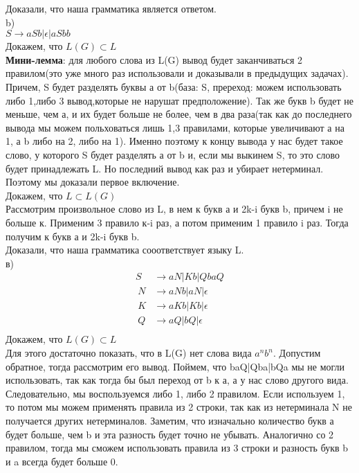 \documentclass[a4paper,12pt]{article}
\begin{document}
Доказали, что наша грамматика является ответом.\\
b)\\
$S\rightarrow aSb|\epsilon|aSbb$\\
Докажем, что $L(G)\subset L$\\
\textbf{Мини-лемма}: для любого слова из L(G) вывод будет заканчиваться 2 правилом(это уже много раз использовали и доказывали в предыдущих задачах). Причем, S будет разделять буквы а от b(база: S, пререход: можем использовать либо 1,либо 3 вывод,которые не нарушат предположение). Так же букв b будет не меньше, чем а, и их будет больше не более, чем в два раза(так как до последнего вывода мы можем польховаться лишь  1,3 правилами, которые увеличивают а на 1, а b либо на 2, либо на 1). Именно поэтому к концу вывода у нас будет такое слово, у которого S будет разделять а от b и, если мы выкинем S, то это слово будет принадлежать L. Но последний вывод как раз и убирает нетерминал. Поэтому мы доказали первое включение.\\
Докажем, что $L \subset L(G)$\\
Рассмотрим произвольное слово из L, в нем к букв а и 2k-i букв b, причем i не больше к. Применим 3 правило к-i раз, а потом применим 1 правило i раз. Тогда получим к букв а и 2k-i букв b.\\
Доказали, что наша грамматика сооответствует языку L.\\
в)\\
\begin{align*}
	S&\to aN|Kb|QbaQ\\\
	N&\to aNb|aN|\epsilon\\\
	K&\to aKb|Kb|\epsilon\\\
	Q&\to aQ|bQ|\epsilon\\\
\end{align*}
Докажем, что $L(G)\subset L$\\
Для этого достаточно показать, что в L(G) нет слова вида $a^nb^n$. Допустим обратное, тогда рассмотрим его вывод. Поймем, что baQ|Qba|bQa мы не могли использовать, так как тогда бы был переход от b к а, а у нас слово другого вида. Следовательно, мы воспользуемся либо 1, либо 2 правилом. Если используем 1, то потом мы можем применять правила из 2 строки, так как из нетерминала N не получается других нетерминалов. Заметим, что изначально количество букв а будет больше, чем b и эта разность будет точно не убывать. Аналогично со 2 правилом, тогда мы сможем использовать правила из 3 строки и разность букв b и a всегда будет больше 0.\\
\end{document}
